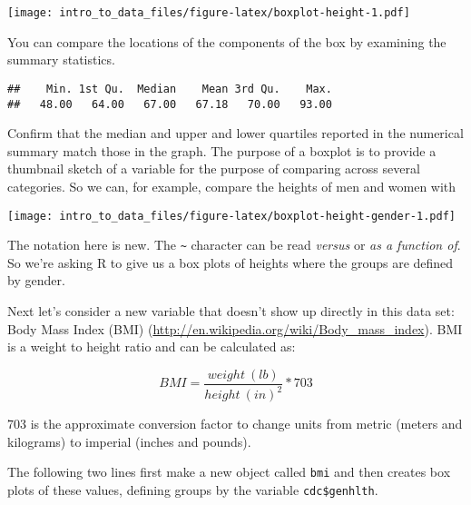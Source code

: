 \documentclass[]{article}
\newenvironment{Shaded}{\begin{snugshade}}{\end{snugshade}}
\newcommand{\KeywordTok}[1]{\textcolor[rgb]{0.13,0.29,0.53}{\textbf{#1}}}
\newcommand{\StringTok}[1]{\textcolor[rgb]{0.31,0.60,0.02}{#1}}
\newcommand{\OperatorTok}[1]{\textcolor[rgb]{0.81,0.36,0.00}{\textbf{#1}}}
\newcommand{\NormalTok}[1]{#1}
\begin{document}
\texttt{[image: intro\_to\_data\_files/figure-latex/boxplot-height-1.pdf]}

You can compare the locations of the components of the box by examining
the summary statistics.

\begin{Shaded}
\end{Shaded}

\begin{verbatim}
##    Min. 1st Qu.  Median    Mean 3rd Qu.    Max. 
##   48.00   64.00   67.00   67.18   70.00   93.00
\end{verbatim}

Confirm that the median and upper and lower quartiles reported in the
numerical summary match those in the graph. The purpose of a boxplot is
to provide a thumbnail sketch of a variable for the purpose of comparing
across several categories. So we can, for example, compare the heights
of men and women with

\begin{Shaded}
\end{Shaded}

\texttt{[image: intro\_to\_data\_files/figure-latex/boxplot-height-gender-1.pdf]}

The notation here is new. The \texttt{\textasciitilde{}} character can
be read \emph{versus} or \emph{as a function of}. So we're asking R to
give us a box plots of heights where the groups are defined by gender.

Next let's consider a new variable that doesn't show up directly in this
data set: Body Mass Index (BMI)
(\url{http://en.wikipedia.org/wiki/Body_mass_index}). BMI is a weight to
height ratio and can be calculated as:

\[ BMI = \frac{weight~(lb)}{height~(in)^2} * 703 \]

703 is the approximate conversion factor to change units from metric
(meters and kilograms) to imperial (inches and pounds).

The following two lines first make a new object called \texttt{bmi} and
then creates box plots of these values, defining groups by the variable
\texttt{cdc\$genhlth}.
\end{document}
